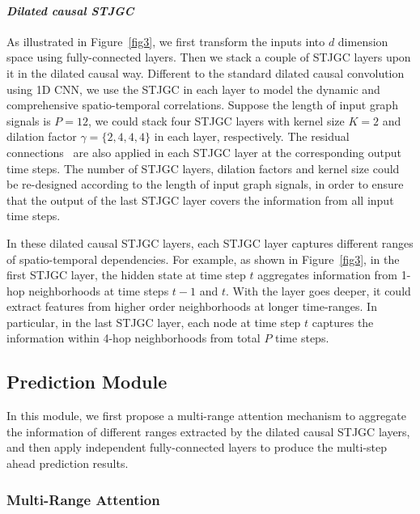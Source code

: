 \documentclass[10pt,journal,compsoc]{IEEEtran}
\begin{document}
\paragraph{\textit{\textbf{Dilated causal STJGC}}} 

As illustrated in Figure~\ref{fig3}, we first transform the inputs into $ d $ dimension space using fully-connected layers. Then we stack a couple of STJGC layers upon it in the dilated causal way. Different to the standard dilated causal convolution using 1D CNN, we use the STJGC in each layer to model the dynamic and comprehensive spatio-temporal correlations. Suppose the length of input graph signals is $ P = 12 $, we could stack four STJGC layers with kernel size $ K = 2 $ and dilation factor $ \gamma = \{2, 4, 4, 4\} $ in each layer, respectively. The residual connections~\cite{He-et-al:CVPR2016} are also applied in each STJGC layer at the corresponding output time steps. The number of STJGC layers, dilation factors and kernel size could be re-designed according to the length of input graph signals, in order to ensure that the output of the last STJGC layer covers the information from all input time steps. 

In these dilated causal STJGC layers, each STJGC layer captures different ranges of spatio-temporal dependencies. For example, as shown in Figure~\ref{fig3}, in the first STJGC layer, the hidden state at time step $ t $ aggregates information from 1-hop neighborhoods at time steps $ t - 1 $ and $ t $. With the layer goes deeper, it could extract features from higher order neighborhoods at longer time-ranges. In particular, in the last STJGC layer, each node at time step $ t $ captures the information within 4-hop neighborhoods from total $ P $ time steps. 

\subsection{Prediction Module} \label{Prediction Module}

In this module, we first propose a multi-range attention mechanism to aggregate the information of different ranges extracted by the dilated causal STJGC layers, and then apply independent fully-connected layers to produce the multi-step ahead prediction results.

\subsubsection{Multi-Range Attention} 
\end{document}
